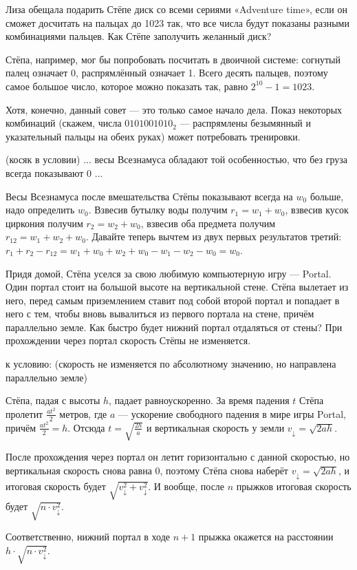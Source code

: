 \begin{itemize}
\itA Лиза обещала подарить Стёпе диск со всеми сериями «Adventure time», если он 
сможет досчитать на пальцах до 1023 так, что все числа будут показаны разными 
комбинациями пальцев. Как Стёпе заполучить желанный диск?

Стёпа, например, мог бы попробовать посчитать в двоичной системе:
согнутый палец означает 0, распрямлённый означает 1. Всего десять пальцев,
поэтому самое большое число, которое можно показать так, равно $2^10-1 = 1023$.

Хотя, конечно, данный совет --- это только самое начало дела. Показ некоторых
комбинаций (скажем, числа $0101001010_2$ --- распрямлены безымянный и указательный
пальцы на обеих руках) может потребовать тренировки.


\itB (косяк в условии) ... весы Всезнамуса обладают той особенностью, что без груза
всегда показывают 0 ...

Весы Всезнамуса после вмешательства Стёпы показывают всегда на $w_0$ больше, надо определить $w_0$.
Взвесив бутылку воды получим $r_1 = w_1 + w_0$, взвесив кусок циркония получим $r_2 = w_2 + w_0$,
взвесив оба предмета получим $r_{12} = w_1 + w_2 + w_0$. Давайте теперь вычтем из двух 
первых результатов третий:
$r_1 + r_2 - r_{12} = w_1 + w_0 + w_2 + w_0 - w_1 - w_2 - w_0 = w_0$.

\itC Придя домой, Стёпа уселся за свою любимую компьютерную игру — Portal. Один портал стоит на большой 
высоте на вертикальной стене. Стёпа вылетает из него, перед самым приземлением ставит под собой второй 
портал и попадает в него с тем, чтобы вновь вывалиться из первого портала на стене, причём параллельно 
земле. Как быстро будет нижний портал отдаляться от стены? При прохождении через портал скорость Стёпы 
не изменяется.

к условию: (скорость не изменяется по абсолютному значению, но направлена параллельно земле)

Стёпа, падая с высоты $h$, падает равноускоренно. За время падения $t$ Стёпа пролетит 
$\frac{at^2}{2}$ метров, где $a$ --- ускорение свободного падения в мире игры Portal, 
причём $\frac{at^2}{2} = h$. Отсюда $t = \sqrt{\frac{2h}{a}}$ и вертикальная скорость
у земли $v_\downarrow = \sqrt{2ah}$.

После прохождения через портал он летит горизонтально с данной скоростью, но вертикальная
скорость снова равна 0, поэтому Стёпа снова наберёт $v_\downarrow = \sqrt{2ah}$, и
итоговая скорость будет $\sqrt{v_\downarrow^2 + v_\downarrow^2}$.
И вообще, после $n$ прыжков итоговая скорость будет $\sqrt{n \cdot v_\downarrow^2}$.

Соответственно, нижний портал в ходе $n+1$ прыжка окажется на расстоянии $h \cdot \sqrt{n \cdot v_\downarrow^2}$.

\end{itemize}
